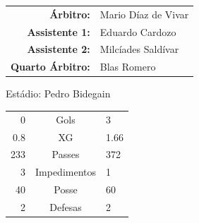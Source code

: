 \documentclass[11pt]{article}
\begin{document}
\vspace{0.5cm}
\begin{minipage}{0.65\textwidth}
\begin{center}
\begin{tabular}{rl}
\textbf{Árbitro:} & Mario Díaz de Vivar \\
\textbf{Assistente 1:} & Eduardo Cardozo \\
\textbf{Assistente 2:} & Milcíades Saldívar \\
\textbf{Quarto Árbitro:} & Blas Romero \\
\end{tabular}
\end{center}
\end{minipage}
\begin{minipage}{0.3\textwidth}
Estádio: Pedro Bidegain\\
\begin{tabular}{rcl}
0 & Gols & 3 \\
0.8 & XG & 1.66 \\
233 & Passes & 372 \\
3 & Impedimentos & 1 \\
40 & Posse & 60 \\
2 & Defesas & 2 \\
\end{tabular}
\end{minipage}
\newpage
\end{document}
